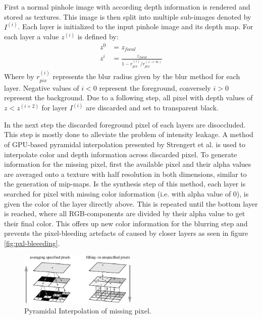 First a normal pinhole image with according depth information is rendered and stored as textures.
This image is then split into multiple sub-images denoted by $I^{(i)}$.
Each layer is initialized to the input pinhole image and its depth map.
For each layer a value $z^{(i)}$ is defined by:
\begin{align}
    z^0 &= z_{focal} \\
    z^i &= \frac{z_{focal}}{1 - r^{(i)}_{pix} / r^{(z \rightarrow \infty)}_{pix}}
\end{align}
Where by $r^{(i)}_{pix}$ represents the blur radius given by the blur method for each layer.
Negative values of $i < 0$ represent the foreground, conversely $i > 0$ represent the background.
Due to a following step, all pixel with depth values of $z < z^{(i+2)}$ for layer $I^{(i)}$ are discarded and set to transparent black.\cite{Kraus.2007}

In the next step the discarded foreground pixel of each layers are disoccluded.
This step is mostly done to alleviate the problem of intensity leakage.
A method of GPU-based pyramidal interpolation presented by Strengert et al. \cite{Strengert.2006} is used to interpolate color and depth information across discarded pixel.
To generate information for the missing pixel, first the available pixel and their alpha values are averaged onto a texture with half resolution in both dimensions, similar to the generation of mip-maps.
Is the synthesis step of this method, each layer is searched for pixel with missing color information (i.e. with alpha value of 0), is given the color of the layer directly above.
This is repeated until the bottom layer is reached, where all RGB-components are divided by their alpha value to get their final color.
This offers up new color information for the blurring step and prevents the pixel-bleeding artefacts of caused by closer layers as seen in figure \ref{fig:pxl-bleeeding}.

\begin{figure}[h]
    \centering
    \includegraphics[width=0.5\textwidth]{images/pyramidal-interpolation.png}
    \caption{Pyramidal Interpolation of missing pixel.\cite{Kraus.2007}}
    \label{fig:pyramidal-interpolation}
\end{figure}

